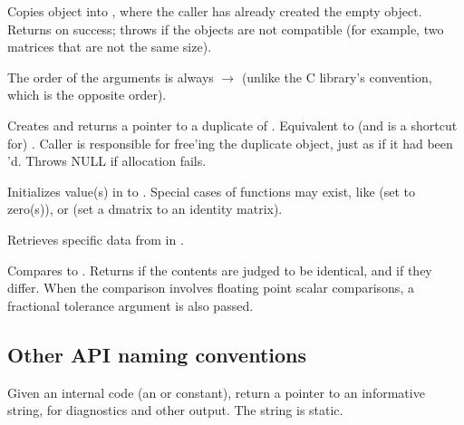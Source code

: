 \begin{sreitems}{}

\item[\ccode{\_Copy(src, dest)}]
Copies  object into , where the caller has
already created the empty  object. Returns 
on success; throws  if the objects are not
compatible (for example, two matrices that are not the same size).

The order of the arguments is always  $\rightarrow$
 (unlike the C library's  convention, which
is the opposite order).

\item[\ccode{\_Duplicate(obj)}] 

Creates and returns a pointer to a duplicate of .
Equivalent to (and is a shortcut for) . Caller is responsible for free'ing the duplicate
object, just as if it had been 'd. Throws NULL if
allocation fails.

\item[\ccode{\_Set*(obj, value...)}]

Initializes value(s) in  to . Special cases of
 functions may exist, like  (set to
zero(s)), or  (set a dmatrix to an
identity matrix).

\item[\ccode{\_Get*(obj...)}]

Retrieves specific data from in .


\item[\ccode{\_Compare*(obj1, obj2...)}]

Compares  to . Returns  if the
contents are judged to be identical, and  if they
differ. When the comparison involves floating point scalar
comparisons, a fractional tolerance argument  is also
passed. 




\end{sreitems}

\subsection{Other API naming conventions}
\begin{sreitems}{}

\item[\ccode{\_DescribeXXX()}]

Given an internal code (an  or  constant),
return a pointer to an informative string, for diagnostics and other
output. The string is static.

\end{sreitems}


